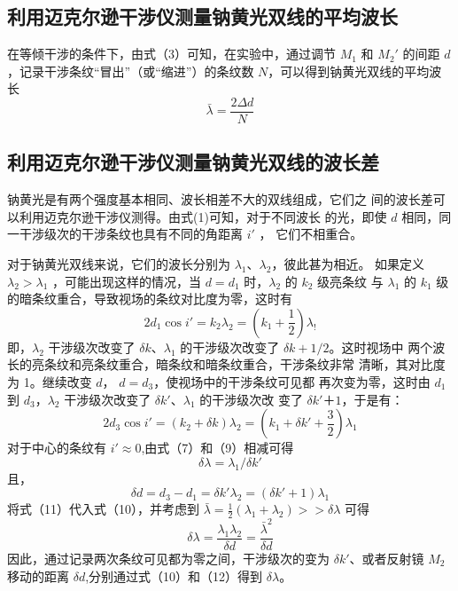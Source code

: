 \documentclass[12pt]{article}
\begin{document}
\subsection{利用迈克尔逊干涉仪测量钠黄光双线的平均波长}
在等倾干涉的条件下，由式（3）可知，在实验中，通过调节 $M_1$ 和 $M_2'$ 的间距 $d$，记录干涉条纹“冒出”（或“缩进”）的条纹数 $N$，可以得到钠黄光双线的平均波长
\begin{equation}
    \bar \lambda=\frac{2\Delta d}{N}
\end{equation} 

\subsection{利用迈克尔逊干涉仪测量钠黄光双线的波长差}
钠黄光是有两个强度基本相同、波长相差不大的双线组成，它们之
间的波长差可以利用迈克尔逊干涉仪测得。由式(1)可知，对于不同波长
的光，即使 $d$ 相同，同一干涉级次的干涉条纹也具有不同的角距离 $i'$ ，
它们不相重合。

对于钠黄光双线来说，它们的波长分别为 $\lambda_1$、$\lambda_2$，彼此甚为相近。
如果定义 $\lambda_2>\lambda_1$
，可能出现这样的情况，当 $d = d_1$ 时，$\lambda_2$ 的 $k_2$ 级亮条纹
与 $\lambda_1$ 的 $k_1$ 级的暗条纹重合，导致视场的条纹对比度为零，这时有 
\begin{equation}
    2d_1\cos i'=k_2\lambda_2=(k_1+\frac 12)\lambda_!
\end{equation}
即，$\lambda_2$ 干涉级次改变了 $\delta k$、$\lambda_1$ 的干涉级次改变了 $\delta k+1/2$。这时视场中
两个波长的亮条纹和亮条纹重合，暗条纹和暗条纹重合，干涉条纹非常
清晰，其对比度为 1。继续改变 $d$， $d = d_3$，使视场中的干涉条纹可见都
再次变为零，这时由 $d_1$ 到 $d_3$，$\lambda_2$ 干涉级次改变了 $\delta k'$、$\lambda_1$ 的干涉级次改
变了 $\delta k'＋1$，于是有：
\begin{equation}
    2d_3\cos i'=(k_2+\delta k)\lambda_2=(k_1+\delta k'+\frac 32)\lambda_1
\end{equation} 
对于中心的条纹有 $i'\approx 0$,由式（7）和（9）相减可得
\begin{equation}
    \delta \lambda=\lambda_1/\delta k'
\end{equation}
且，
\begin{equation}
    \delta d=d_3-d_1=\delta k'\lambda_2=(\delta k'+1)\lambda_1
\end{equation}
将式（11）代入式（10），并考虑到 $\bar\lambda =\frac 12(\lambda_1+\lambda_2)>>\delta \lambda$ 可得
\begin{equation}
    \delta \lambda=\frac{\lambda_1\lambda_2}{\delta d}=\frac{\bar\lambda^2}{\delta d}
\end{equation}
因此，通过记录两次条纹可见都为零之间，干涉级次的变为 $\delta k'$、或者反射镜 $M_2$ 移动的距离 $\delta d$,分别通过式（10）和（12）得到 $\delta \lambda$。
\end{document}
